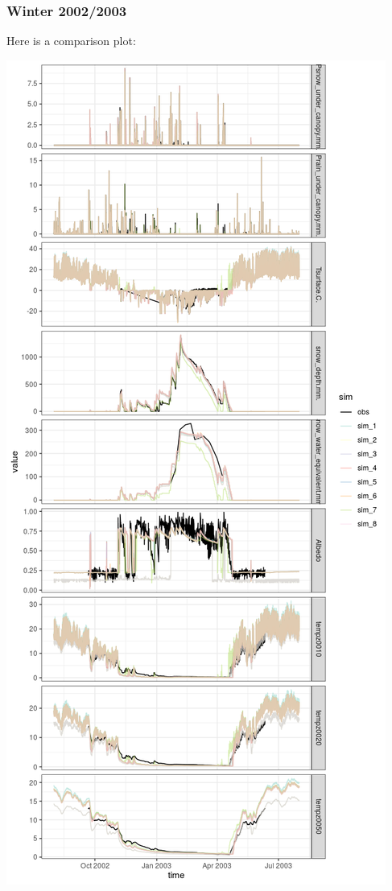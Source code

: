 \documentclass[
]{article}
\begin{document}
\hypertarget{winter-20022003}{%
\subsubsection{Winter 2002/2003}\label{winter-20022003}}

Here is a comparison plot:

\includegraphics{coldelaporte_v6_files/figure-latex/Winter_2002_2003-1.png}
\end{document}
